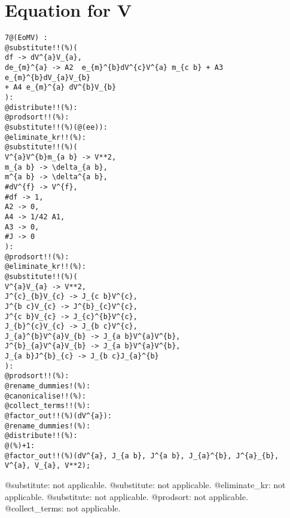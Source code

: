 \documentclass[11pt]{article}
\begin{document}
\section*{Equation for V}
{\color[named]{Blue}\begin{verbatim}
7@(EoMV) :
@substitute!!(%)(
df -> dV^{a}V_{a},
de_{m}^{a} -> A2  e_{m}^{b}dV^{c}V^{a} m_{c b} + A3 e_{m}^{b}dV_{a}V_{b} 
+ A4 e_{m}^{a} dV^{b}V_{b}
):
@distribute!!(%):
@prodsort!!(%):
@substitute!!(%)(@(ee)):
@eliminate_kr!!(%):
@substitute!!(%)(
V^{a}V^{b}m_{a b} -> V**2,
m_{a b} -> \delta_{a b},
m^{a b} -> \delta^{a b},
#dV^{f} -> V^{f},
#df -> 1,
A2 -> 0,
A4 -> 1/42 A1,
A3 -> 0,
#J -> 0
):
@prodsort!!(%):
@eliminate_kr!!(%):
@substitute!!(%)(
V^{a}V_{a} -> V**2,
J^{c}_{b}V_{c} -> J_{c b}V^{c},
J^{b c}V_{c} -> J^{b}_{c}V^{c},
J^{c b}V_{c} -> J_{c}^{b}V^{c},
J_{b}^{c}V_{c} -> J_{b c}V^{c},
J_{a}^{b}V^{a}V_{b} -> J_{a b}V^{a}V^{b},
J^{b}_{a}V^{a}V_{b} -> J_{a b}V^{a}V^{b},
J_{a b}J^{b}_{c} -> J_{b c}J_{a}^{b}
):
@prodsort!!(%):
@rename_dummies!(%):
@canonicalise!!(%):
@collect_terms!!(%):
@factor_out!!(%)(dV^{a}):
@rename_dummies!(%):
@distribute!!(%):
@(%)+1:
@factor_out!!(%)(dV^{a}, J_{a b}, J^{a b}, J_{a}^{b}, J^{a}_{b}, V^{a}, V_{a}, V**2);
\end{verbatim}}
@substitute: not applicable.
@substitute: not applicable.
@eliminate\_kr: not applicable.
@substitute: not applicable.
@prodsort: not applicable.
@collect\_terms: not applicable.
\end{document}
